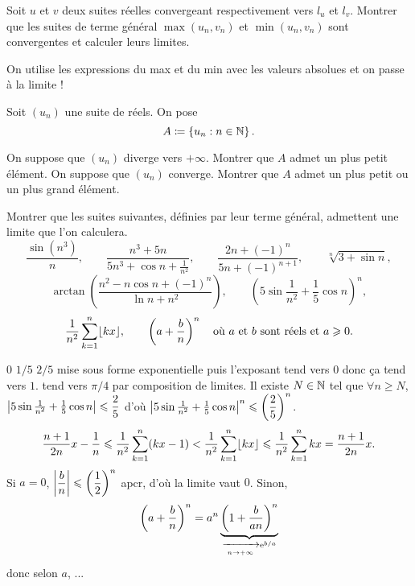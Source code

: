 \documentclass{magnolia}
\begin{document}





Soit $u$ et $v$ deux suites réelles convergeant respectivement vers $l_u$ et
$l_v$. Montrer que les suites de terme général $\max(u_n,v_n)$ et
$\min(u_n,v_n)$ sont convergentes et calculer leurs limites.
\begin{sol}
On utilise les expressions du max et du min avec les valeurs absolues et on passe à la limite !
\end{sol}

Soit $(u_n)$ une suite de réels. On pose
\[A\coloneqq\left\{u_n : n\in\mathbb{N}\right\}.\]
\begin{questions}
\question On suppose que $(u_n)$ diverge vers $+\infty$. Montrer que $A$ admet un plus petit
  élément.
\question On suppose que $(u_n)$ converge. Montrer que $A$ admet un plus petit ou un plus grand  élément.
\end{questions}

Montrer que les suites suivantes, définies par leur terme général, admettent une
limite que l'on calculera.
\[\frac{\sin (n^3)}{n}, \qquad \frac{n^3+5n}{5n^3+\cos n+\frac{1}{n^2}}, \qquad
  \frac{2n+(-1)^n}{5n+(-1)^{n+1}}, \qquad \sqrt[n]{3+\sin n},\]
\[\arctan\left(\frac{n^2-n\cos n +(-1)^n}{\ln n + n^2}\right), \qquad
  \left(5\sin\frac{1}{n^2}+\frac{1}{5}\cos n\right)^n,\]
\[\frac{1}{n^2} \sum_{k=1}^{n} \ent{kx},
  \qquad \left(a+\frac{b}{n}\right)^n \quad
  \text{o\`u $a$ et $b$ sont réels et $a\geq 0$}.\]
\begin{sol}
\begin{questions}
\question $0$
\question $1/5$
\question $2/5$
\question mise sous forme exponentielle puis l'exposant tend vers $0$ donc ça tend vers $1$.
\question tend vers $\pi/4$ par composition de limites.
\question Il existe $N\in \mathbb{N}$ tel que $\forall n\geq N$, $\left|5\sin\frac{1}{n^2}+\frac{1}{5}\cos n\right|\leqslant \dfrac{2}{5}$ d'où $\left|5\sin\frac{1}{n^2}+\frac{1}{5}\cos n\right|^n\leqslant \left(\dfrac{2}{5}\right)^n$.
\question $$\frac{n+1}{2n}x-\frac{1}{n}\leq \frac{1}{n^2} \sum_{k=1}^{n} (kx-1)<\frac{1}{n^2} \sum_{k=1}^{n} \ent{kx}\leq \frac{1}{n^2} \sum_{k=1}^{n} kx=\frac{n+1}{2n}x.$$
\question Si $a=0$, $\displaystyle\left|\frac{b}{n}\right|\leqslant \left(\frac{1}{2}\right)^n$ apcr, d'où la limite vaut $0$. Sinon, $$\left(a+\frac{b}{n}\right)^n=a^n\underbrace{\left(1+\frac{b}{an}\right)^n}_{\xrightarrow[n\rightarrow +\infty]{}{{\rm e}^{b/a}}}$$ donc selon $a$, ...
\end{questions}
\end{sol}
\end{document}
